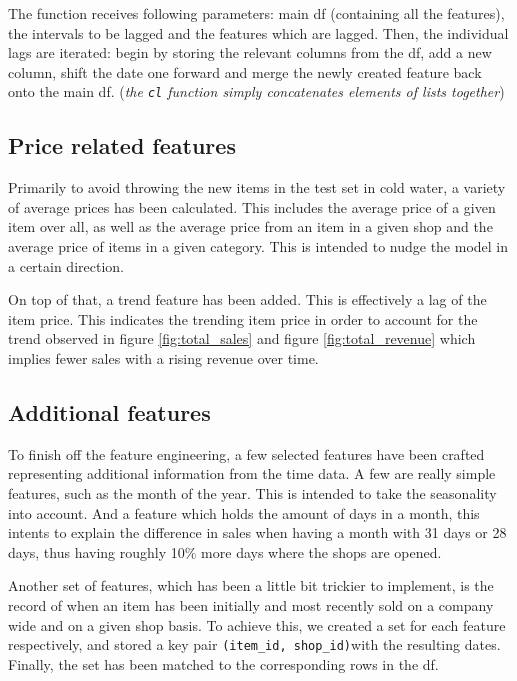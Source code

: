 

The function receives following parameters: main \gls{df} (containing all the features), the intervals to be lagged and the features which are lagged. Then, the individual lags are iterated: begin by storing the relevant columns from the \gls{df}, add a new column, shift the date one forward and merge the newly created feature back onto the main \gls{df}. (\textit{the \texttt{cl} function simply concatenates elements of lists together})


\subsection{Price related features}

Primarily to avoid throwing the new items in the test set in cold water, a variety of average prices has been calculated. This includes the average price of a given item over all, as well as the average price from an item in a given shop and the average price of items in a given category.
This is intended to nudge the model in a certain direction.

On top of that, a trend feature has been added. This is effectively a lag of the item price. This indicates the trending item price in order to account for the trend observed in figure \ref{fig:total_sales} and figure \ref{fig:total_revenue} which implies fewer sales with a rising revenue over time.

\subsection{Additional features}

To finish off the feature engineering, a few selected features have been crafted representing additional information from the time data. A few are really simple features, such as the month of the year. This is intended to take the seasonality into account. And a feature which holds the amount of days in a month, this intents to explain the difference in sales when having a month with 31 days or 28 days, thus having roughly 10\% more days where the shops are opened.

Another set of features, which has been a little bit trickier to implement, is the record of when an item has been initially and most recently sold on a company wide and on a given shop basis.
To achieve this, we created a set for each feature respectively, and stored a key pair \texttt{(item\_id, shop\_id)}with the resulting dates. Finally, the set has been matched to the corresponding rows in the \gls{df}.
